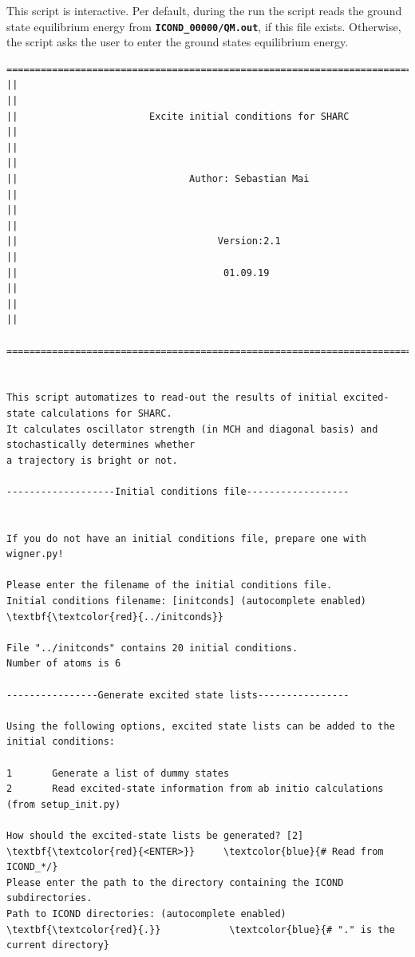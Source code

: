 \documentclass[a4paper,11pt,DIV=15,openany]{scrbook}
\newcommand{\ttt}[1]{\textbf{\texttt{#1}}}
\begin{document}
This script is interactive. 
Per default, during the run the script reads the ground state equilibrium energy from \ttt{ICOND\_00000/QM.out}, if this file exists. 
Otherwise, the script asks the user to enter the ground states equilibrium energy.

\begin{oframed}
\footnotesize\begin{Verbatim}[commandchars=\\\{\}]
  ================================================================================
||                                                                                ||
||                       Excite initial conditions for SHARC                      ||
||                                                                                ||
||                              Author: Sebastian Mai                             ||
||                                                                                ||
||                                   Version:2.1                                  ||
||                                    01.09.19                                    ||
||                                                                                ||
  ================================================================================


This script automatizes to read-out the results of initial excited-state calculations for SHARC.
It calculates oscillator strength (in MCH and diagonal basis) and stochastically determines whether
a trajectory is bright or not.
  
-------------------Initial conditions file------------------


If you do not have an initial conditions file, prepare one with wigner.py!

Please enter the filename of the initial conditions file.
Initial conditions filename: [initconds] (autocomplete enabled) \textbf{\textcolor{red}{../initconds}}

File "../initconds" contains 20 initial conditions.
Number of atoms is 6

----------------Generate excited state lists----------------

Using the following options, excited state lists can be added to the initial conditions:

1       Generate a list of dummy states
2       Read excited-state information from ab initio calculations (from setup_init.py)

How should the excited-state lists be generated? [2] \textbf{\textcolor{red}{<ENTER>}}     \textcolor{blue}{# Read from ICOND_*/}
Please enter the path to the directory containing the ICOND subdirectories.
Path to ICOND directories: (autocomplete enabled) \textbf{\textcolor{red}{.}}            \textcolor{blue}{# "." is the current directory}


\end{Verbatim}
\end{oframed}
\end{document}
